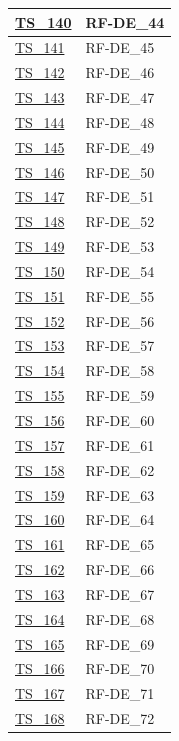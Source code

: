 \begin{longtable}{|
		>{\raggedright\arraybackslash}p{} |
		>{\centering\arraybackslash}p{} |
	}
	\hyperlink{ts-140}{TS\_140} & RF-DE\_44 \\ \hline
	\hyperlink{ts-141}{TS\_141} & RF-DE\_45 \\ \hline
	\hyperlink{ts-142}{TS\_142} & RF-DE\_46 \\ \hline
	\hyperlink{ts-143}{TS\_143} & RF-DE\_47 \\ \hline
	\hyperlink{ts-144}{TS\_144} & RF-DE\_48 \\ \hline
	\hyperlink{ts-145}{TS\_145} & RF-DE\_49 \\ \hline
	\hyperlink{ts-146}{TS\_146} & RF-DE\_50 \\ \hline
	\hyperlink{ts-147}{TS\_147} & RF-DE\_51 \\ \hline
	\hyperlink{ts-148}{TS\_148} & RF-DE\_52 \\ \hline
	\hyperlink{ts-149}{TS\_149} & RF-DE\_53 \\ \hline
	\hyperlink{ts-150}{TS\_150} & RF-DE\_54 \\ \hline
	\hyperlink{ts-151}{TS\_151} & RF-DE\_55 \\ \hline
	\hyperlink{ts-152}{TS\_152} & RF-DE\_56 \\ \hline
	\hyperlink{ts-153}{TS\_153} & RF-DE\_57 \\ \hline
	\hyperlink{ts-154}{TS\_154} & RF-DE\_58 \\ \hline
	\hyperlink{ts-155}{TS\_155} & RF-DE\_59 \\ \hline
	\hyperlink{ts-156}{TS\_156} & RF-DE\_60 \\ \hline
	\hyperlink{ts-157}{TS\_157} & RF-DE\_61 \\ \hline
	\hyperlink{ts-158}{TS\_158} & RF-DE\_62 \\ \hline
	\hyperlink{ts-159}{TS\_159} & RF-DE\_63 \\ \hline
	\hyperlink{ts-160}{TS\_160} & RF-DE\_64 \\ \hline
	\hyperlink{ts-161}{TS\_161} & RF-DE\_65 \\ \hline
	\hyperlink{ts-162}{TS\_162} & RF-DE\_66 \\ \hline
	\hyperlink{ts-163}{TS\_163} & RF-DE\_67 \\ \hline
	\hyperlink{ts-164}{TS\_164} & RF-DE\_68 \\ \hline
	\hyperlink{ts-165}{TS\_165} & RF-DE\_69 \\ \hline
	\hyperlink{ts-166}{TS\_166} & RF-DE\_70 \\ \hline
	\hyperlink{ts-167}{TS\_167} & RF-DE\_71 \\ \hline
	\hyperlink{ts-168}{TS\_168} & RF-DE\_72 \\ \hline

\end{longtable}

